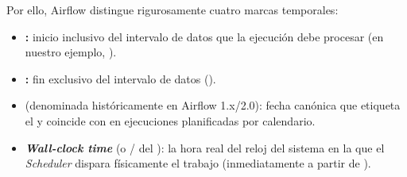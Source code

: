 Por ello, Airflow distingue rigurosamente cuatro marcas temporales:
\begin{itemize}
  \item \textbf{:} inicio inclusivo del intervalo de datos que la ejecución debe procesar (en nuestro ejemplo, ).
  \item \textbf{:} fin exclusivo del intervalo de datos ().
  \item \textbf{} (denominada históricamente  en Airflow 1.x/2.0): fecha canónica que etiqueta el  y coincide con  en ejecuciones planificadas por calendario.
  \item \textbf{\textit{Wall-clock time}} (o  /  del ): la hora real del reloj del sistema en la que el \textit{Scheduler} dispara físicamente el trabajo (inmediatamente a partir de ).
\end{itemize}

